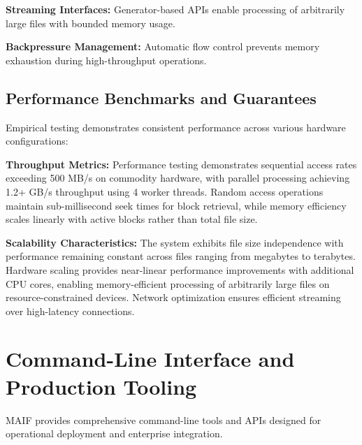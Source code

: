 \documentclass[conference]{IEEEtran}
\begin{document}
\textbf{Streaming Interfaces:} Generator-based APIs enable processing of arbitrarily large files with bounded memory usage.

\textbf{Backpressure Management:} Automatic flow control prevents memory exhaustion during high-throughput operations.

\subsection{Performance Benchmarks and Guarantees}

Empirical testing demonstrates consistent performance across various hardware configurations:

\textbf{Throughput Metrics:} Performance testing demonstrates sequential access rates exceeding 500 MB/s on commodity hardware, with parallel processing achieving 1.2+ GB/s throughput using 4 worker threads. Random access operations maintain sub-millisecond seek times for block retrieval, while memory efficiency scales linearly with active blocks rather than total file size.

\textbf{Scalability Characteristics:} The system exhibits file size independence with performance remaining constant across files ranging from megabytes to terabytes. Hardware scaling provides near-linear performance improvements with additional CPU cores, enabling memory-efficient processing of arbitrarily large files on resource-constrained devices. Network optimization ensures efficient streaming over high-latency connections.

\section{Command-Line Interface and Production Tooling}

MAIF provides comprehensive command-line tools and APIs designed for operational deployment and enterprise integration.
\end{document}

